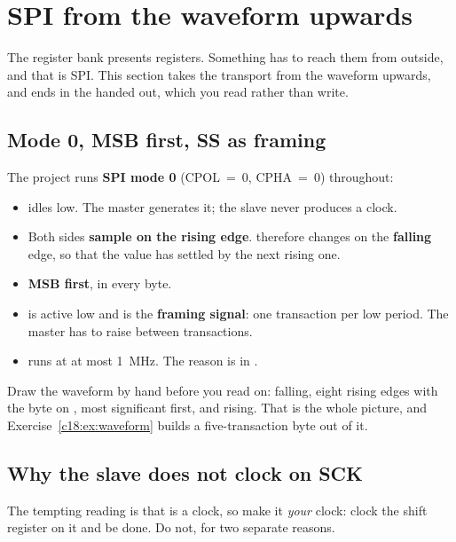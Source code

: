 
\section{SPI from the waveform upwards}
\label{c18:sec:spi}

The register bank presents registers. Something has to reach them from outside, and that is SPI. This
section takes the transport from the waveform upwards, and ends in the  handed out,
which you read rather than write.

\subsection*{Mode 0, MSB first, SS as framing}
The project runs \textbf{SPI mode 0} (CPOL~=~0, CPHA~=~0) throughout:
\begin{itemize}
  \item {} idles low. The master generates it; the slave never produces a clock.
  \item Both sides \textbf{sample on the rising edge}.  therefore changes on the
    \textbf{falling} edge, so that the value has settled by the next rising one.
  \item \textbf{MSB first}, in every byte.
  \item {} is active low and is the \textbf{framing signal}: one transaction per low period.
    The master has to raise  between transactions.
  \item {} runs at at most 1~MHz. The reason is in .
\end{itemize}

Draw the waveform by hand before you read on:  falling, eight rising  edges with
the byte  on , most significant first, and  rising. That is the whole
picture, and Exercise~\ref{c18:ex:waveform} builds a five-transaction byte out of it.

\subsection{Why the slave does not clock on SCK}
\label{c18:sub:oversample}

The tempting reading is that  is a clock, so make it \emph{your} clock: clock the shift
register on it and be done. Do not, for two separate reasons.

